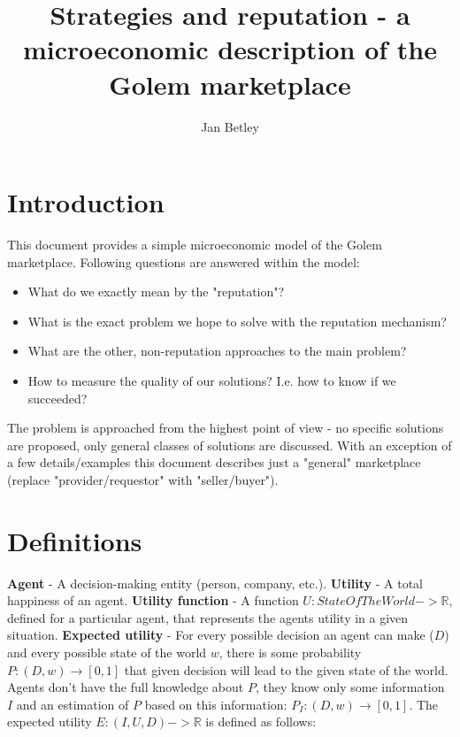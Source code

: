 \documentclass{article}
\title{Strategies and reputation - a microeconomic description of the Golem marketplace}
\author{Jan Betley}
\begin{document}
\maketitle
\section{Introduction}
This document provides a simple microeconomic model of the Golem marketplace. 
Following questions are answered within the model:

\begin{itemize}
    \item What do we exactly mean by the "reputation"?
    \item What is the exact problem we hope to solve with the reputation mechanism?
    \item What are the other, non-reputation approaches to the main problem?
    \item How to measure the quality of our solutions? I.e. how to know if we succeeded?
\end{itemize}


The problem is approached from the highest point of view - no specific solutions are proposed, only general classes of solutions are discussed.
With an exception of a few details/examples this document describes just a "general" marketplace (replace "provider/requestor" with "seller/buyer").

\section{Definitions}

\textbf{Agent} - A decision-making entity (person, company, etc.).
\newline
\textbf{Utility} - A total happiness of an agent.
\newline
\textbf{Utility function} - A function $U: StateOfTheWorld -> \mathbb{R}$, defined for a particular agent, that represents the agents utility in a given situation.
\newline
\textbf{Expected utility} - For every possible decision an agent can make ($D$) and every possible state of the world $w$, there is some probability $P: (D, w) \rightarrow [0, 1]$  that given decision will lead to the given state of the world.
Agents don't have the full knowledge about $P$, they know only some information $I$ and an estimation of $P$ based on this information: $P_I: (D, w) \rightarrow [0, 1]$. The expected utility $E: (I, U, D) -> \mathbb{R}$ is defined as follows:
\end{document}
